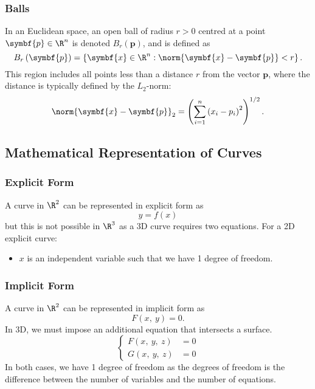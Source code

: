 \documentclass{article}
\begin{document}
\subsubsection{Balls}
In an Euclidean space, an open ball of radius \(r > 0\) centred at a point \(\symbf{p} \in \R^n\)
is denoted \(B_r\left( \symbf{p} \right)\), and is defined as
\begin{equation*}
    B_r\left( \symbf{p} \right) = \left\{ \symbf{x} \in \R^n : \norm{\symbf{x} - \symbf{p}} < r \right\}.
\end{equation*}
This region includes all points less than a distance \(r\) from the vector \(\symbf{p}\),
where the distance is typically defined by the \(L_2\)-norm:
\begin{equation*}
    \norm{\symbf{x} - \symbf{p}}_2 = \left( \sum_{i=1}^n \left( x_i - p_i \right)^2 \right)^{1/2}.
\end{equation*}
\subsection{Mathematical Representation of Curves}
\subsubsection{Explicit Form}
A curve in \(\R^2\) can be represented in explicit form as
\begin{equation*}
    y = f\left( x \right)
\end{equation*}
but this is not possible in \(\R^3\) as a 3D curve requires two equations.
For a 2D explicit curve:
\begin{itemize}
    \item \(x\) is an independent variable such that we have 1 degree of freedom.
\end{itemize}
\subsubsection{Implicit Form}
A curve in \(\R^2\) can be represented in implicit form as
\begin{equation*}
    F\left( x,\: y \right) = 0.
\end{equation*}
In 3D, we must impose an additional equation that intersects a surface.
\begin{equation*}
    \left\{ \begin{aligned}
        F\left( x,\: y,\: z \right) & = 0 \\
        G\left( x,\: y,\: z \right) & = 0
    \end{aligned} \right.
\end{equation*}
In both cases, we have 1 degree of freedom as the degrees of freedom is the
difference between the number of variables and the number of equations.
\end{document}
